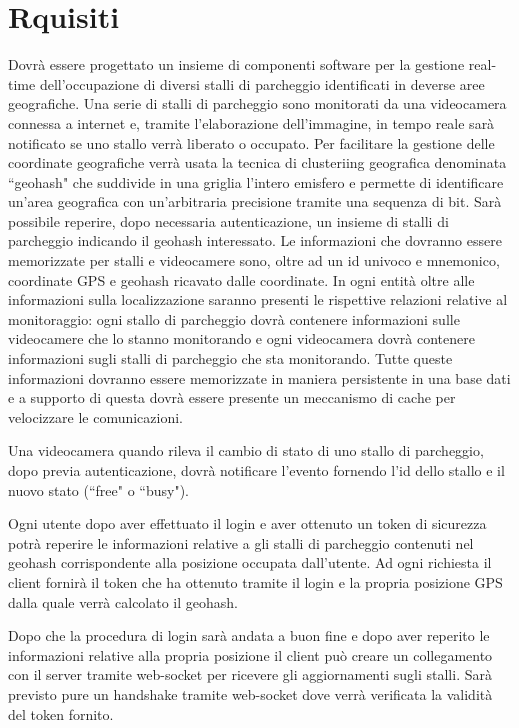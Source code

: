 \chapter{Rquisiti}
Dovrà essere progettato un insieme di componenti software per la gestione real-time dell'occupazione di diversi stalli di parcheggio identificati in deverse aree geografiche.
Una serie di stalli di parcheggio sono monitorati da una videocamera connessa a internet e, tramite l'elaborazione dell'immagine, in tempo reale sarà notificato se uno stallo verrà liberato o occupato. Per facilitare la gestione  delle coordinate geografiche verrà usata la tecnica di clusteriing geografica denominata ``geohash" che suddivide in una griglia l'intero emisfero e permette di identificare un'area geografica con un'arbitraria precisione tramite una sequenza di bit. Sarà possibile reperire, dopo necessaria autenticazione, un insieme di stalli di parcheggio indicando il geohash interessato. Le informazioni che dovranno essere memorizzate per stalli e videocamere sono, oltre ad un id univoco e mnemonico, coordinate GPS e geohash ricavato dalle coordinate. In ogni entità oltre alle informazioni sulla localizzazione saranno presenti le rispettive relazioni relative al monitoraggio: ogni stallo di parcheggio dovrà contenere informazioni sulle videocamere che lo stanno monitorando e ogni videocamera dovrà contenere informazioni sugli stalli di parcheggio che sta monitorando.
Tutte queste informazioni dovranno essere memorizzate in maniera persistente in una base dati e a supporto di questa dovrà essere presente un meccanismo di cache per velocizzare le comunicazioni.

Una videocamera quando rileva il cambio di stato di uno stallo di parcheggio, dopo previa autenticazione, dovrà notificare l'evento fornendo l'id dello stallo e il nuovo stato (``free" o ``busy").

Ogni utente dopo aver effettuato il login e aver ottenuto un token di sicurezza potrà reperire le informazioni relative a gli stalli di parcheggio contenuti nel geohash corrispondente alla posizione occupata dall'utente. Ad ogni richiesta il client fornirà il token che ha ottenuto tramite il login e la propria posizione GPS dalla quale verrà calcolato il geohash.

Dopo che la procedura di login sarà andata a buon fine e dopo aver reperito le informazioni relative alla propria posizione il client può creare un collegamento con il server tramite web-socket per ricevere gli aggiornamenti sugli stalli. Sarà previsto pure un handshake tramite web-socket dove verrà verificata la validità del token fornito.





